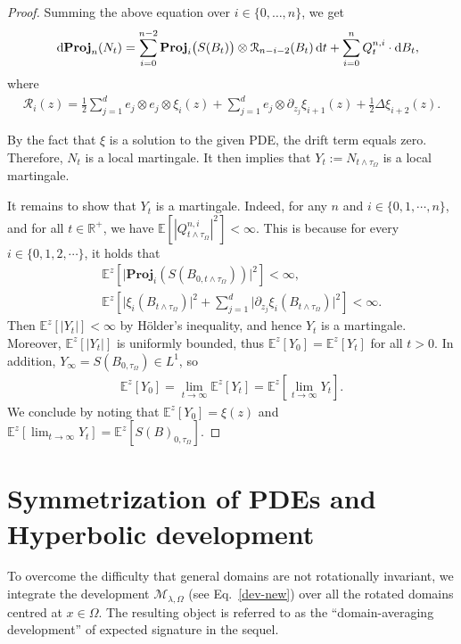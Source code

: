 \documentclass[11pt,a4paper,english,reqno]{amsart}
\theoremstyle{plain}
\newcommand{\dd}{{\rm d}}
\newcommand{\1}{\mathbbm{1}}
\newcommand{\proj}{\mathbf{Proj}}
\begin{document}
\begin{proof}
Summing the above equation over $i \in \{0, \ldots, n\}$, we get
\begin{eqnarray*}
&&\dd \proj_{n}(N_{t}) = \sum_{i = 0}^{n-2}\proj_{i}\big(S(B_{t})\big)\otimes \mathcal{R}_{n - i-2}(B_{t}) \,\dd t +\sum_{i = 0}^{n}Q^{n, i}_{t}\cdot \dd B_{t},
\end{eqnarray*}
where 
\begin{eqnarray*}
\mathcal{R}_{i}(z) = \frac{1}{2} \sum_{j=1}^{d}e_{j}\otimes e_{j} \otimes \xi_{i}(z) + \sum_{j=1}^{d} e_{j}\otimes \partial_{z_{j}}\xi_{i+1}(z) + \frac{1}{2}\Delta \xi_{i+2}(z). 
\end{eqnarray*}

By the fact that $\xi$ is a solution to the given PDE, the drift term equals zero. Therefore, $N_{t}$ is a local martingale. It then implies that $Y_{t}:= N_{t \wedge \tau_{\Omega}}$ is a local martingale. 


It remains to show that $Y_{t}$ is a martingale. Indeed, for any $n$ and $i \in \{0, 1, \cdots, n\}$, and for all $t \in \mathbb{R}^{+}$, we have  $\mathbb{E}\left[\left| Q^{n,i}_{t \wedge \tau_{\Omega}}\right|^{2}\right] < \infty$. This is because for every $i \in \{0, 1, 2, \cdots\}$, it holds that
\begin{eqnarray*}
&& \mathbb{E}^{z}\left[\vert \proj_{i}(S(B_{0, t \wedge \tau_{\Omega}}))\vert^{2}\right] < \infty, \\
&& \mathbb{E}^{z}\left[\Big\vert \xi_{i}(B_{t \wedge \tau_{\Omega}})\Big\vert^{2} + \sum_{j=1}^{d} \Big\vert\partial_{z_{j}} \xi_{i}(B_{t \wedge \tau_{\Omega}})\Big\vert^{2}\right] < \infty.
\end{eqnarray*}
Then $\mathbb{E}^{z}[\vert Y_{t}\vert] < \infty$ by H\"{o}lder's inequality, and hence $Y_{t}$ is a martingale. Moreover, $\mathbb{E}^{z}[\vert Y_{t}\vert]$ is uniformly bounded, thus $\mathbb{E}^{z}[Y_{0}] = \mathbb{E}^{z}[Y_{t}]$ for all $t >0$. In addition,  $Y_{\infty}= S(B_{0, \tau_{\Omega}}) \in L^{1}$, so
\begin{eqnarray*}
\mathbb{E}^{z}[Y_{0}] = \lim_{t \rightarrow \infty} \mathbb{E}^{z}[Y_{t}] = \mathbb{E}^{z}\left[\lim_{t \rightarrow \infty }Y_{t}\right].
\end{eqnarray*}
We conclude by noting that $\mathbb{E}^{z}[Y_{0}] = \xi(z) $ and  $\mathbb{E}^{z}[\lim_{t \rightarrow \infty }Y_{t}] = \mathbb{E}^{z}[S(B)_{0, \tau_{\Omega}}]$. \end{proof}

\section{Symmetrization of PDEs and Hyperbolic development}\label{sec: symm}
To overcome the difficulty that general domains are not rotationally invariant, we integrate the development $\mathcal{M}_{\lambda,\Omega}$ (see Eq.~\eqref{dev-new}) over all the rotated domains centred at $x \in \Omega$. The resulting object is referred to as the ``domain-averaging development'' of expected signature in the sequel. 
\end{document}
